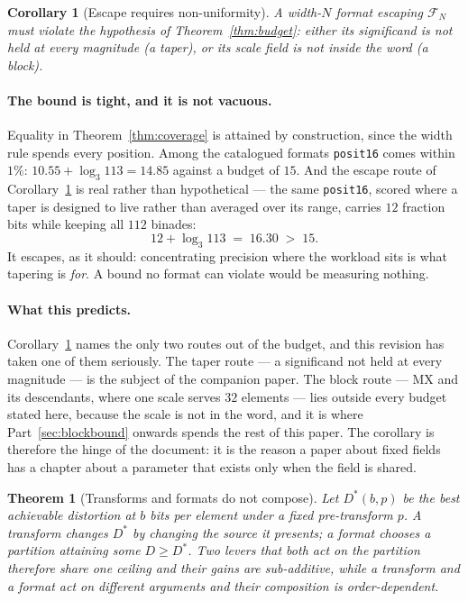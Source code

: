 \documentclass[11pt]{article}
\newtheorem{theorem}{Theorem}
\newtheorem{corollary}{Corollary}
\theoremstyle{definition}
\begin{document}
\begin{corollary}[Escape requires non-uniformity]
\label{cor:escape}
A width-$N$ format escaping $\mathcal{F}_N$ must violate the hypothesis of
Theorem~\ref{thm:budget}: either its significand is not held at every magnitude
(a taper), or its scale field is not inside the word (a block).
\end{corollary}

\paragraph{The bound is tight, and it is not vacuous.} Equality in
Theorem~\ref{thm:coverage} is attained by construction, since the width rule
spends every position. Among the catalogued formats \texttt{posit16} comes within
$1\%$: $10.55 + \log_3 113 = 14.85$ against a budget of $15$. And the escape route
of Corollary~\ref{cor:escape} is real rather than hypothetical --- the same
\texttt{posit16}, scored where a taper is designed to live rather than averaged
over its range, carries $12$ fraction bits while keeping all $112$ binades:
\[
  12 + \log_3 113 \;=\; 16.30 \;>\; 15 .
\]
It escapes, as it should: concentrating precision where the workload sits is what
tapering is \emph{for}. A bound no format can violate would be measuring nothing.

\paragraph{What this predicts.} Corollary~\ref{cor:escape} names the only two
routes out of the budget, and this revision has taken one of them seriously. The
taper route --- a significand not held at every magnitude --- is the subject of
the companion paper. The block route --- MX and its descendants, where one scale
serves $32$ elements --- lies outside every budget stated here, because the scale
is not in the word, and it is where Part~\ref{sec:blockbound} onwards spends the
rest of this paper. The corollary is therefore the hinge of the document: it is
the reason a paper about fixed fields has a chapter about a parameter that exists
only when the field is shared.

\begin{theorem}[Transforms and formats do not compose]
\label{thm:compose}
Let $D^{*}(b,p)$ be the best achievable distortion at $b$ bits per element under
a fixed pre-transform $p$. A transform changes $D^{*}$ by changing the source it
presents; a format chooses a partition attaining some $D \ge D^{*}$. Two levers
that both act on the partition therefore share one ceiling and their gains are
sub-additive, while a transform and a format act on different arguments and their
composition is order-dependent.
\end{theorem}
\end{document}
